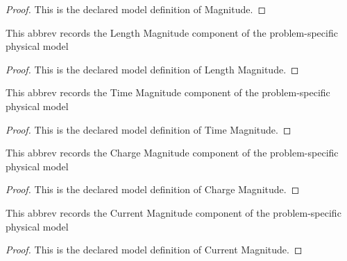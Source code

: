 \begin{proof}
  This is the declared model definition of Magnitude.
\end{proof}
\begin{definition}
  \label{def:physics:phyx-mini-0971:phyxminiproblems-problemphyxmini0971-lengthmagnitude}
  This abbrev records the Length Magnitude component of the problem-specific physical model
\end{definition}
\begin{proof}
  This is the declared model definition of Length Magnitude.
\end{proof}
\begin{definition}
  \label{def:physics:phyx-mini-0971:phyxminiproblems-problemphyxmini0971-timemagnitude}
  This abbrev records the Time Magnitude component of the problem-specific physical model
\end{definition}
\begin{proof}
  This is the declared model definition of Time Magnitude.
\end{proof}
\begin{definition}
  \label{def:physics:phyx-mini-0971:phyxminiproblems-problemphyxmini0971-chargemagnitude}
  This abbrev records the Charge Magnitude component of the problem-specific physical model
\end{definition}
\begin{proof}
  This is the declared model definition of Charge Magnitude.
\end{proof}
\begin{definition}
  \label{def:physics:phyx-mini-0971:phyxminiproblems-problemphyxmini0971-currentmagnitude}
  This abbrev records the Current Magnitude component of the problem-specific physical model
\end{definition}
\begin{proof}
  This is the declared model definition of Current Magnitude.
\end{proof}
